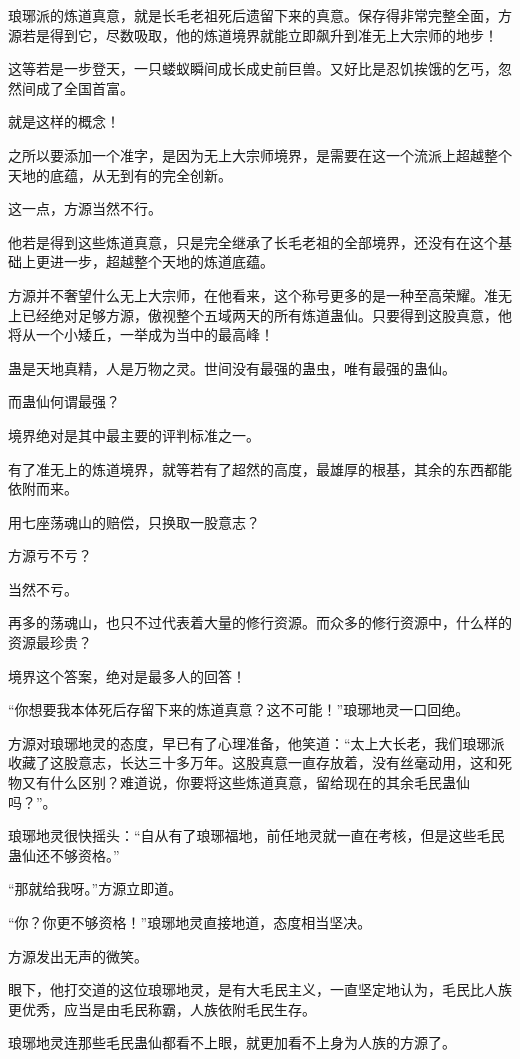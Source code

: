 \begin{this_body}
琅琊派的炼道真意，就是长毛老祖死后遗留下来的真意。保存得非常完整全面，方源若是得到它，尽数吸取，他的炼道境界就能立即飙升到准无上大宗师的地步！

这等若是一步登天，一只蝼蚁瞬间成长成史前巨兽。又好比是忍饥挨饿的乞丐，忽然间成了全国首富。

就是这样的概念！

之所以要添加一个准字，是因为无上大宗师境界，是需要在这一个流派上超越整个天地的底蕴，从无到有的完全创新。

这一点，方源当然不行。

他若是得到这些炼道真意，只是完全继承了长毛老祖的全部境界，还没有在这个基础上更进一步，超越整个天地的炼道底蕴。

方源并不奢望什么无上大宗师，在他看来，这个称号更多的是一种至高荣耀。准无上已经绝对足够方源，傲视整个五域两天的所有炼道蛊仙。只要得到这股真意，他将从一个小矮丘，一举成为当中的最高峰！

蛊是天地真精，人是万物之灵。世间没有最强的蛊虫，唯有最强的蛊仙。

而蛊仙何谓最强？

境界绝对是其中最主要的评判标准之一。

有了准无上的炼道境界，就等若有了超然的高度，最雄厚的根基，其余的东西都能依附而来。

用七座荡魂山的赔偿，只换取一股意志？

方源亏不亏？

当然不亏。

再多的荡魂山，也只不过代表着大量的修行资源。而众多的修行资源中，什么样的资源最珍贵？

境界这个答案，绝对是最多人的回答！

“你想要我本体死后存留下来的炼道真意？这不可能！”琅琊地灵一口回绝。

方源对琅琊地灵的态度，早已有了心理准备，他笑道：“太上大长老，我们琅琊派收藏了这股意志，长达三十多万年。这股真意一直存放着，没有丝毫动用，这和死物又有什么区别？难道说，你要将这些炼道真意，留给现在的其余毛民蛊仙吗？”。

琅琊地灵很快摇头：“自从有了琅琊福地，前任地灵就一直在考核，但是这些毛民蛊仙还不够资格。”

“那就给我呀。”方源立即道。

“你？你更不够资格！”琅琊地灵直接地道，态度相当坚决。

方源发出无声的微笑。

眼下，他打交道的这位琅琊地灵，是有大毛民主义，一直坚定地认为，毛民比人族更优秀，应当是由毛民称霸，人族依附毛民生存。

琅琊地灵连那些毛民蛊仙都看不上眼，就更加看不上身为人族的方源了。


\end{this_body}
